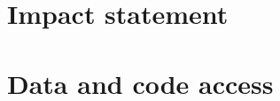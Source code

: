 \documentclass[11pt]{report}
\begin{document}

\chapter*{Impact statement}%

\chapter*{Data and code access}




\clearpage
\tableofcontents

\clearpage
\listoftables

\clearpage
\listoffigures


%
\end{document}
